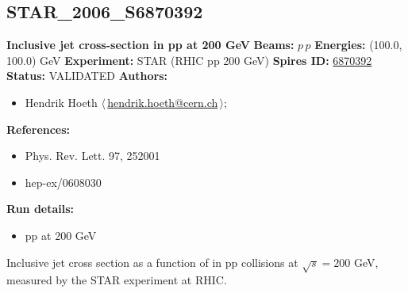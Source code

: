 \subsection[STAR\_2006\_S6870392]{STAR\_2006\_S6870392\,\cite{Abelev:2006uq}}
\textbf{Inclusive jet cross-section in pp at 200 GeV}\newline
\textbf{Beams:} $p$\,$p$ \newline
\textbf{Energies:} (100.0, 100.0) GeV \newline
\textbf{Experiment:} STAR (RHIC pp 200 GeV) \newline
\textbf{Spires ID:} \href{http://www.slac.stanford.edu/spires/find/hep/www?rawcmd=key+6870392}{6870392}\newline
\textbf{Status:} VALIDATED\newline
\textbf{Authors:}
\begin{itemize}
  \item Hendrik Hoeth $\langle\,$\href{mailto:hendrik.hoeth@cern.ch}{hendrik.hoeth@cern.ch}$\,\rangle$;
\end{itemize}
\textbf{References:}
\begin{itemize}
  \item Phys. Rev. Lett. 97, 252001
  \item hep-ex/0608030
\end{itemize}
\textbf{Run details:}
\begin{itemize}

  \item pp at 200 GeV\end{itemize}

\noindent Inclusive jet cross section as a function of \pT in pp collisions at $\sqrt{s} = 200$ GeV, measured by the STAR experiment at RHIC.

\clearpage


\clearpage

